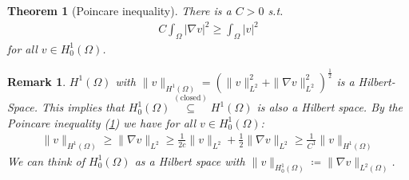 \documentclass{report}
\theoremstyle{tommy}
\newtheorem{thm}[defn]{Theorem}
\newtheorem{rem}[defn]{Remark}
\begin{document}
  \begin{thm}[Poincare inequality]\label{Poincare-inequality}
    There is a \(C > 0\) s.t. 
    \begin{align*}
      C \int_\Omega|\nabla v|^2 \ge \int_\Omega |v|^2
    \end{align*}
    for all \(v \in H_0^1(\Omega)\).
  \end{thm}
  
  \begin{rem}
    \(H^1(\Omega)\) with \(\|v\|_{H^1(\Omega)} = \left(\|v\|_{L^2}^2 + \|\nabla v\|_{L^2}^2\right)^{\frac{1}{2}}\) is a Hilbert-Space. This implies that \(H_0^1(\Omega) \overset{(\text{closed})}{\subseteq} H^1(\Omega)\) is also a Hilbert space.
    By the Poincare inequality (\ref{Poincare-inequality}) we have for all \(v \in H_0^1(\Omega)\):
    \begin{align*}
      \|v\|_{H^1(\Omega)} \ge \|\nabla v\|_{L^2} \ge \frac{1}{2c} \|v\|_{L^2} + \frac{1}{2} \|\nabla v\|_{L^2} \ge \frac{1}{C^1} \|v\|_{H^1(\Omega)}
    \end{align*}
    We can think of \(H_0^1(\Omega)\) as a Hilbert space with \(\|v\|_{H_0^1(\Omega)} \coloneqq \|\nabla v\|_{L^2(\Omega)}\).
  \end{rem}
\end{document}
